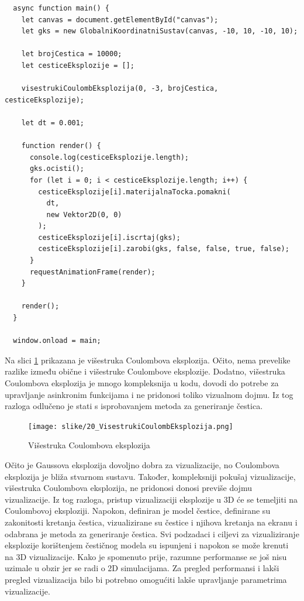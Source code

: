 \documentclass{foi}
\begin{document}
\begin{verbatim}
  async function main() {
    let canvas = document.getElementById("canvas");
    let gks = new GlobalniKoordinatniSustav(canvas, -10, 10, -10, 10);

    let brojCestica = 10000;
    let cesticeEksplozije = [];

    visestrukiCoulombEksplozija(0, -3, brojCestica, cesticeEksplozije);

    let dt = 0.001;

    function render() {
      console.log(cesticeEksplozije.length);
      gks.ocisti();
      for (let i = 0; i < cesticeEksplozije.length; i++) {
        cesticeEksplozije[i].materijalnaTocka.pomakni(
          dt,
          new Vektor2D(0, 0)
        );
        cesticeEksplozije[i].iscrtaj(gks);
        cesticeEksplozije[i].zarobi(gks, false, false, true, false);
      }
      requestAnimationFrame(render);
    }

    render();
  }

  window.onload = main;
\end{verbatim}

Na slici \ref{fig:VisestrukiCoulombEksplozija} prikazana je višestruka Coulombova eksplozija. Očito, nema prevelike razlike između obične i višestruke Coulombove eksplozije. Dodatno, višestruka Coulombova eksplozija je mnogo kompleksnija u kodu, dovodi do potrebe za upravljanje asinkronim funkcijama i ne pridonosi toliko vizualnom dojmu. Iz tog razloga odlučeno je stati s isprobavanjem metoda za generiranje čestica. 

\begin{figure}[H]
    \centering
    \texttt{[image: slike/20\_VisestrukiCoulombEksplozija.png]}
    \captionsetup{justification=centering}
    \caption{Višestruka Coulombova eksplozija}
\label{fig:VisestrukiCoulombEksplozija}
\end{figure}

Očito je Gaussova eksplozija dovoljno dobra za vizualizacije, no Coulombova eksplozija je bliža stvarnom sustavu. Također, kompleksniji pokušaj vizualizacije, višestruka Coulombova eksplozija, ne pridonosi donosi previše dojmu vizualizacije. Iz tog razloga, pristup vizualizaciji eksplozije u 3D će se temeljiti na Coulombovoj eksploziji. Napokon, definiran je model čestice, definirane su zakonitosti kretanja čestica, vizualizirane su čestice i njihova kretanja na ekranu i odabrana je metoda za generiranje čestica. Svi podzadaci i ciljevi za vizualiziranje eksplozije korištenjem čestičnog modela su ispunjeni i napokon se može krenuti na 3D vizualizacije. Kako je spomenuto prije, razumne performanse se još nisu uzimale u obzir jer se radi o 2D simulacijama. Za pregled performansi i lakši pregled vizualizacija bilo bi potrebno omogućiti lakše upravljanje parametrima vizualizacije.
\end{document}
